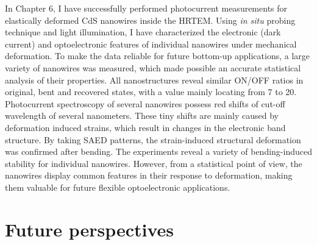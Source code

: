 In Chapter 6, I have successfully performed photocurrent measurements for elastically deformed CdS nanowires inside the HRTEM. Using {\it in situ}  probing technique and light illumination, I have characterized the electronic (dark current) and optoelectronic features of individual nanowires under mechanical deformation. 
To make the data reliable for future bottom-up applications, a large variety of nanowires was measured, which made possible an accurate statistical analysis of their properties. 
All nanostructures reveal similar ON/OFF ratios in original, bent and recovered states, with a value mainly locating from 7 to 20. 
Photocurrent spectroscopy of several nanowires possess red shifts of cut-off wavelength of several nanometers. 
These tiny shifts are mainly caused by deformation induced strains, which result in changes in the electronic band structure. 
By taking SAED patterns, the strain-induced structural deformation was confirmed after bending. 
The experiments reveal a variety of bending-induced stability for individual nanowires. However, from a statistical point of view, the nanowires display common features in their response to deformation, making them valuable for future flexible optoelectronic applications. \\

\section{Future perspectives}


